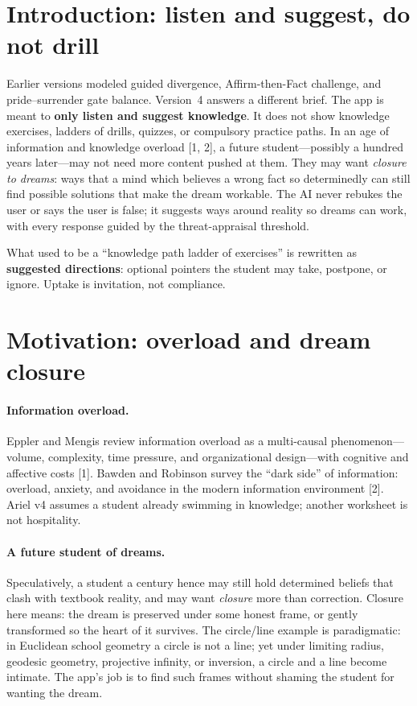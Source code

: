 \documentclass[11pt, a4paper]{article}
\begin{document}
\section{Introduction: listen and suggest, do not drill}
Earlier versions modeled guided divergence, Affirm-then-Fact challenge, and pride--surrender gate balance. Version~4 answers a different brief. The app is meant to \textbf{only listen and suggest knowledge}. It does not show knowledge exercises, ladders of drills, quizzes, or compulsory practice paths. In an age of information and knowledge overload [1, 2], a future student---possibly a hundred years later---may not need more content pushed at them. They may want \emph{closure to dreams}: ways that a mind which believes a wrong fact so determinedly can still find possible solutions that make the dream workable. The AI never rebukes the user or says the user is false; it suggests ways around reality so dreams can work, with every response guided by the threat-appraisal threshold.

What used to be a ``knowledge path ladder of exercises'' is rewritten as \textbf{suggested directions}: optional pointers the student may take, postpone, or ignore. Uptake is invitation, not compliance.

\section{Motivation: overload and dream closure}
\paragraph{Information overload.}
Eppler and Mengis review information overload as a multi-causal phenomenon---volume, complexity, time pressure, and organizational design---with cognitive and affective costs [1]. Bawden and Robinson survey the ``dark side'' of information: overload, anxiety, and avoidance in the modern information environment [2]. Ariel v4 assumes a student already swimming in knowledge; another worksheet is not hospitality.

\paragraph{A future student of dreams.}
Speculatively, a student a century hence may still hold determined beliefs that clash with textbook reality, and may want \emph{closure} more than correction. Closure here means: the dream is preserved under some honest frame, or gently transformed so the heart of it survives. The circle/line example is paradigmatic: in Euclidean school geometry a circle is not a line; yet under limiting radius, geodesic geometry, projective infinity, or inversion, a circle and a line become intimate. The app's job is to find such frames without shaming the student for wanting the dream.
\end{document}
